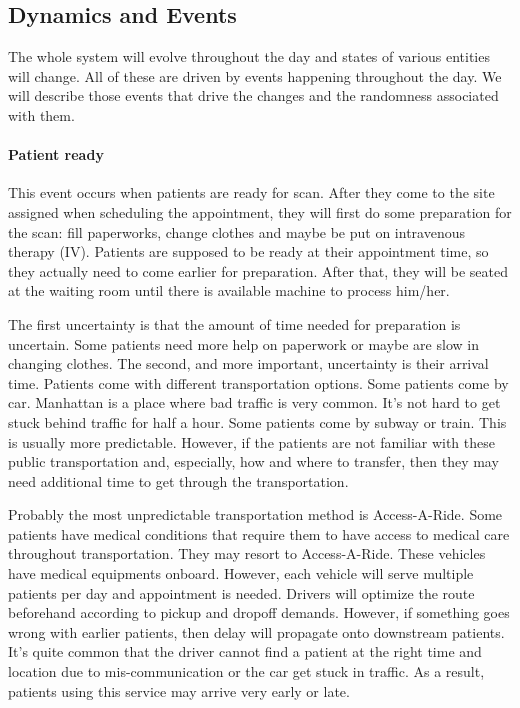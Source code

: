 \subsection{Dynamics and Events}

The whole system will evolve throughout the day and states of various entities will change. All of these are driven by events happening throughout the day. We will describe those events that drive the changes and the randomness associated with them.

\paragraph{Patient ready}

This event occurs when patients are ready for scan. After they come to the site assigned when scheduling the appointment, they will first do some preparation for the scan: fill paperworks, change clothes and maybe be put on intravenous therapy (IV). Patients are supposed to be ready at their appointment time, so they actually need to come earlier for preparation. After that, they will be seated at the waiting room until there is available machine to process him/her.

The first uncertainty is that the amount of time needed for preparation is uncertain. Some patients need more help on paperwork or maybe are slow in changing clothes. The second, and more important, uncertainty is their arrival time. Patients come with different transportation options. Some patients come by car. Manhattan is a place where bad traffic is very common. It's not hard to get stuck behind traffic for half a hour. Some patients come by subway or train. This is usually more predictable. However, if the patients are not familiar with these public transportation and, especially, how and where to transfer, then they may need additional time to get through the transportation.

Probably the most unpredictable transportation method is Access-A-Ride. Some patients have medical conditions that require them to have access to medical care throughout transportation. They may resort to Access-A-Ride. These vehicles have medical equipments onboard. However, each vehicle will serve multiple patients per day and appointment is needed. Drivers will optimize the route beforehand according to pickup and dropoff demands. However, if something goes wrong with earlier patients, then delay will propagate onto downstream patients. It's quite common that the driver cannot find a patient at the right time and location due to mis-communication or the car get stuck in traffic. As a result, patients using this service may arrive very early or late.

